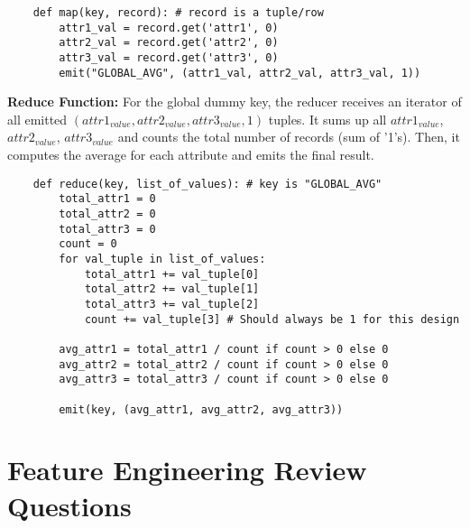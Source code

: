\documentclass{article}
\begin{document}
\begin{enumerate}
    \lstset{language=Python}
    \begin{lstlisting}
    def map(key, record): # record is a tuple/row
        attr1_val = record.get('attr1', 0)
        attr2_val = record.get('attr2', 0)
        attr3_val = record.get('attr3', 0)
        emit("GLOBAL_AVG", (attr1_val, attr2_val, attr3_val, 1))
    \end{lstlisting}

    \textbf{Reduce Function:}
    For the global dummy key, the reducer receives an iterator of all emitted $(attr1_{value}, attr2_{value}, attr3_{value}, 1)$ tuples.
    It sums up all $attr1_{value}$, $attr2_{value}$, $attr3_{value}$ and counts the total number of records (sum of '1's).
    Then, it computes the average for each attribute and emits the final result.

    \lstset{language=Python}
    \begin{lstlisting}
    def reduce(key, list_of_values): # key is "GLOBAL_AVG"
        total_attr1 = 0
        total_attr2 = 0
        total_attr3 = 0
        count = 0
        for val_tuple in list_of_values:
            total_attr1 += val_tuple[0]
            total_attr2 += val_tuple[1]
            total_attr3 += val_tuple[2]
            count += val_tuple[3] # Should always be 1 for this design

        avg_attr1 = total_attr1 / count if count > 0 else 0
        avg_attr2 = total_attr2 / count if count > 0 else 0
        avg_attr3 = total_attr3 / count if count > 0 else 0

        emit(key, (avg_attr1, avg_attr2, avg_attr3))
    \end{lstlisting}

\end{enumerate}

\section*{Feature Engineering Review Questions}
\end{document}
